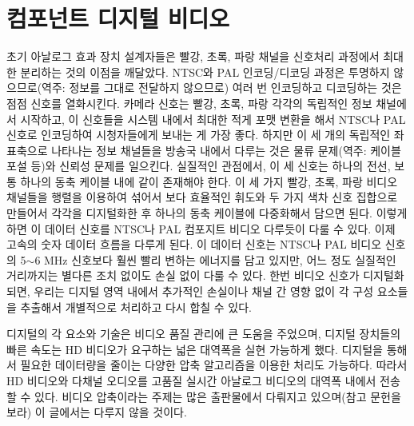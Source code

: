 \section{컴포넌트 디지털 비디오}
초기 아날로그 효과 장치 설계자들은 빨강, 초록, 파랑 채널을 신호처리 과정에서 최대한 분리하는 것의 이점을 깨달았다.
NTSC와 PAL 인코딩/디코딩 과정은 투명하지 않으므로(역주: 정보를 그대로 전달하지 않으므로) 여러 번 인코딩하고 디코딩하는 것은 점점 신호를 열화시킨다.
카메라 신호는 빨강, 초록, 파랑 각각의 독립적인 정보 채널에서 시작하고, 이 신호들을 시스템 내에서 최대한 적게 포맷 변환을 해서 NTSC나 PAL 신호로 인코딩하여 시청자들에게 보내는 게 가장 좋다.
하지만 이 세 개의 독립적인 좌표축으로 나타나는 정보 채널들을 방송국 내에서 다루는 것은 물류 문제(역주: 케이블 포설 등)와 신뢰성 문제를 일으킨다.
실질적인 관점에서, 이 세 신호는 하나의 전선, 보통 하나의 동축 케이블 내에 같이 존재해야 한다.
이 세 가지 빨강, 초록, 파랑 비디오 채널들을 행렬을 이용하여 섞어서 보다 효율적인 휘도와 두 가지 색차 신호 집합으로 만들어서 각각을 디지털화한 후 하나의 동축 케이블에 다중화해서 담으면 된다.
이렇게 하면 이 데이터 신호를 NTSC나 PAL 컴포지트 비디오 다루듯이 다룰 수 있다. 이제 고속의 숫자 데이터 흐름을 다루게 된다.
이 데이터 신호는 NTSC나 PAL 비디오 신호의 5$\sim$6 MHz 신호보다 훨씬 빨리 변하는 에너지를 담고 있지만, 어느 정도 실질적인 거리까지는 별다른 조치 없이도 손실 없이 다룰 수 있다.
한번 비디오 신호가 디지털화되면, 우리는 디지털 영역 내에서 추가적인 손실이나 채널 간 영향 없이 각 구성 요소들을 추출해서 개별적으로 처리하고 다시 합칠 수 있다.

디지털의 각 요소와 기술은 비디오 품질 관리에 큰 도움을 주었으며, 디지털 장치들의 빠른 속도는 HD 비디오가 요구하는 넓은 대역폭을 실현 가능하게 했다.
디지털을 통해서 필요한 데이터량을 줄이는 다양한 압축 알고리즘을 이용한 처리도 가능하다.
따라서 HD 비디오와 다채널 오디오를 고품질 실시간 아날로그 비디오의 대역폭 내에서 전송할 수 있다.
비디오 압축이라는 주제는 많은 출판물에서 다뤄지고 있으며(참고 문헌을 보라) 이 글에서는 다루지 않을 것이다.
